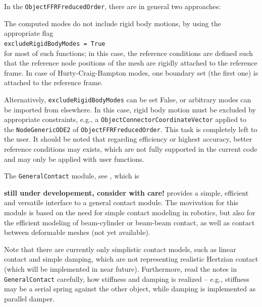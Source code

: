In the \texttt{ObjectFFRFreducedOrder}, there are in general two approaches:
\bi
  \item The computed modes do not include rigid body motions, by using the appropriate flag\\ \texttt{excludeRigidBodyModes = True}\\ for most of such functions; in this case, the reference conditions are defined such that the reference node positions of the mesh are rigidly attached to the reference frame. In case of Hurty-Craig-Bampton modes, one boundary set (the first one) is attached to the reference frame.
  \item Alternatively, \texttt{excludeRigidBodyModes} can be set False, or arbitrary modes can be imported from elsewhere.
    In this case, rigid body motion must be excluded by appropriate constraints, e.g., a \texttt{ObjectConnectorCoordinateVector} applied to the \texttt{NodeGenericODE2} of \texttt{ObjectFFRFreducedOrder}. This task is completely left to the user.
\ei
It should be noted that regarding efficiency or highest accuracy, better reference conditions may exists, which are not fully supported in the current code and may only be applied with user functions.





















\clearpage
\label{secContactTheory}
% 
The \texttt{GeneralContact} module, see ,  which is 
\bi
  \item[] {\bf still under developement, consider with care!}
\ei
provides a simple, efficient and versatile interface to a general contact module. The movivation for this module is based on the need for simple contact modeling in robotics, but also for the efficient modeling of beam-cylinder or beam-beam contact, as well as contact between deformable meshes (not yet available).

Note that there are currently only simplistic contact models, such as linear contact and simple damping, which are not representing realistic Hertzian contact (which will be implemented in near future). Furthermore, read the notes in \texttt{GeneralContact} carefully, how stiffness and damping is realized -- e.g., stiffness may be a serial spring against the other object, while damping is implemented as parallel damper.

